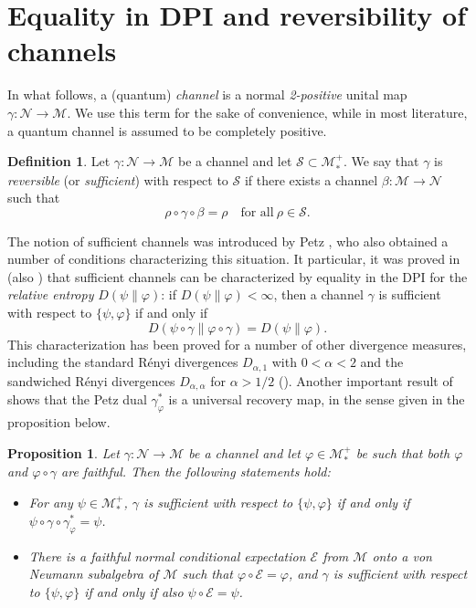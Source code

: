 \documentclass[12pt]{article}
\newtheorem{prop}[theorem]{Proposition}
\theoremstyle{definition}
\newtheorem{defi}[theorem]{Definition}
\theoremstyle{remark}
\numberwithin{equation}{section}
\def\Me{\mathcal M}
\def\Ne{\mathcal N}
\def\ffi{\varphi}
\begin{document}
\section{Equality in DPI and reversibility of channels}


In what follows, a (quantum) \emph{channel} is a normal \emph{2-positive} unital
map $\gamma: \Ne\to \Me$. We use this term for the sake of convenience, while in most literature,
a quantum channel is assumed to be completely positive.

\begin{defi}\label{defi:reversible}
Let $\gamma:\Ne\to \Me$ be a channel and let $\mathcal S \subset
\Me_*^+$. We say that $\gamma$ is \emph{reversible} (or \emph{sufficient}) with respect to
$\mathcal S$ if there exists a channel $\beta:\Me\to \Ne$ such that
\[
\rho\circ\gamma\circ\beta=\rho\quad\mbox{for all}\ \rho\in \mathcal S.
\]
\end{defi}

The notion of sufficient channels was introduced by Petz
\cite{petz1986sufficient,petz1988sufficiency}, who also obtained a number of conditions
characterizing this situation. It particular, it was proved in \cite{petz1988sufficiency}
(also \cite{jencova2006sufficiency}) that sufficient channels can be characterized by
equality in the DPI for the \emph{relative entropy} $D(\psi\|\varphi)$: if $D(\psi\|\varphi)<\infty$,
then a channel $\gamma$ is sufficient with respect to $\{\psi,\varphi\}$ if and only if 
\[
D(\psi\circ\gamma\|\varphi\circ\gamma)=D(\psi\|\varphi). 
\]
This characterization has been proved for a number of other divergence measures, including the
standard R\'enyi divergences $D_{\alpha,1}$ with $0<\alpha<2$  and the sandwiched
R\'enyi divergences $D_{\alpha,\alpha}$ for $\alpha>1/2$
(\cite{hiai2021quantum,jencova2018renyi,jencova2021renyi}).
Another important result of \cite{petz1988sufficiency} shows that the Petz dual $\gamma_\varphi^*$
is a universal recovery map, in the sense given in the proposition below. 

\begin{prop}\label{prop:universal}
Let $\gamma:\Ne\to \Me$ be a channel and let $\varphi\in \Me_*^+$ be such that both $\ffi$ and
$\ffi\circ\gamma$ are faithful. Then the following statements hold:
\begin{itemize}
\item[(i)] For any $\psi\in \Me_*^+$, $\gamma$ is sufficient with respect to $\{\psi,\varphi\}$ if and only
if $\psi\circ\gamma\circ\gamma_\varphi^*=\psi$.

\item[(ii)]
There is a faithful normal conditional expectation $\mathcal E$ from $\Me$ onto a von Neumann
subalgebra of $\Me$ such that $\varphi\circ \mathcal E=\varphi$, and $\gamma$ is sufficient with
respect to $\{\psi,\varphi\}$ if and only if also $\psi\circ\mathcal E=\psi$.
\end{itemize}
\end{prop}
\end{document}
